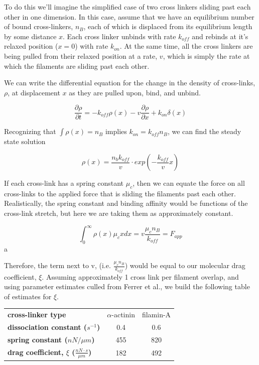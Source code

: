 \documentclass[pre,preprint]{revtex4-1}
\begin{document}
To do this we'll imagine the simplified case of two cross linkers sliding past each other in one dimension.  In this case, assume that we have an equilibrium number of bound cross-linkers, $n_B$, each of which is displaced from its equilibrium length by some distance $x$.  Each cross linker unbinds with rate $k_{off}$ and rebinds at it's relaxed position ($x=0$) with rate $k_{on}$.  At the same time, all the cross linkers are being pulled from their relaxed position at a rate, $v$, which is simply the rate at which the filaments are sliding past each other.  

We can write the differential equation for the change in the density of cross-links, $\rho$, at displacement $x$ as they are pulled upon, bind, and unbind.

\begin{equation}
\frac{\partial \rho}{\partial t} = -k_{off}\rho(x) - v\frac{\partial \rho}{\partial x} + k_{on}\delta(x)
\end{equation}

Recognizing that $\int \rho(x)=n_B$ implies $k_{on}=k_{off}n_B$, we can find the steady state solution

\begin{equation}
\rho(x) = \frac{n_b k_{off}}{v}\cdot exp\left ( -\frac{k_{off}}{v}x \right )
\end{equation}

If each cross-link has a spring constant $\mu_c$, then we can equate the force on all cross-links to the applied force that is sliding the filaments past each other.  Realistically, the spring constant and binding affinity would be functions of the cross-link stretch, but here we are taking them as approximately constant.  

\begin{equation}
\int_{0}^{\infty}\rho(x)\mu_cx dx = v \frac{\mu_c n_B}{k_{off}}= F_{app}
\end{equation}a

Therefore, the term next to v, (i.e. $\tfrac{\mu_c n_B}{k_{off}}$) would be equal to our molecular drag coefficient, $\xi$.  Assuming approximately 1 cross link per filament overlap, and using parameter estimates culled from Ferrer et al., we build the following table of estimates for $\xi$.

\begin{table}[h]
\begin{tabular}{| l | c | c |}
\hline
\textbf{cross-linker type} & $\alpha$-actinin & filamin-A  \\ \cline{1-1}
\textbf{dissociation constant ($s^{-1}$)} & 0.4 & 0.6 \\ \cline{1-1}
\textbf{spring constant ($nN / \mu m$)} & 455 & 820 \\ \cline{1-1}
\textbf{drag coefficient, $\xi$ ($\tfrac{nN \cdot s}{\mu m}$)} & 182 & 492 \\ 
\hline
\end{tabular}
\end{table}
\end{document}
